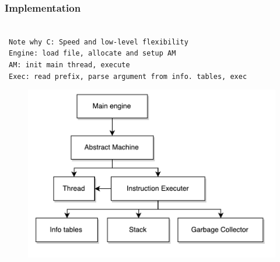 \documentclass{beamer}
\newcommand{\n}[1]{\leavevmode\\~\texttt{\color{red}\tiny #1}}
\begin{document}
\begin{frame}
  \frametitle{Implementation}

  \n{Note why C: Speed and low-level flexibility}
  \n{Engine: load file, allocate and setup AM}
  \n{AM: init main thread, execute}
  \n{Exec: read prefix, parse argument from info. tables, exec}

  \begin{figure}[H]
    \centering
    \includegraphics[scale=0.5]{../figures/arch.pdf}
  \end{figure}
\end{frame}
\end{document}
